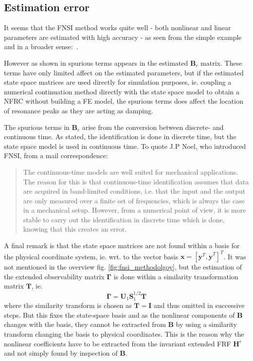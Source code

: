 \subsection{Estimation error}
\label{sec:fnsi-estimation-error}

It seems that the FNSI method works quite well - both nonlinear and linear
parameters are estimated with high accuracy - as seen from the simple example
and in a broader sense:~\autocites{noel2013a, noel2014a, noel2014b,
  noel2012time}.

However as shown in \autocite{gourc2016a} spurious terms appears in the
estimated $\bm B_c$ matrix. These terms have only limited affect on the
estimated parameters, but if the estimated state space matrices are used
directly for simulation purposes, ie. coupling a numerical continuation method
directly with the state space model to obtain a NFRC without building a FE
model, the spurious terms does affect the location of resonance peaks as they
are acting as damping.

The spurious terms in $\bm B_c$ arise from the conversion between discrete- and
continuous time. As stated, the identification is done in discrete time, but the state space
model is used in continuous time.
To quote J.P Noel, who introduced FNSI, from a mail correspondence:
\begin{quote}
The continuous-time models are well suited for mechanical applications. The reason
for this is that continuous-time identification assumes that data are acquired
in band-limited conditions, i.e. that the input and the output are only
measured over a finite set of frequencies, which is always the case in a
mechanical setup. However, from a numerical point of view, it is more stable to
carry out the identification in discrete time which is done, knowing that this
creates an error.
\end{quote}

A final remark is that the state space matrices are not found within a basis for
the physical coordinate system, ie. wrt. to the vector basis $\bm x=[\bm y^T,
\dot{\bm y}^T]^T$. It was not mentioned in the overview fig.
\ref{fig:fnsi_methodolgoy}, but the estimation of the extended observability
matrix $\bm \Gamma$ is done within a similarity transformation matrix $\bm
T$, ie.
\begin{equation}
  \bm \Gamma = \bm U_1 \bm S_1^{1/2} \bm T
\end{equation}
where the similarity transform is chosen as $\bm T = \bm I$ and thus omitted in
successive steps. But this fixes the state-space basis and as the nonlinear
components of $\bm B$ changes with the basis, they cannot be extracted from $\bm
B$ by using a similarity transform changing the basis to physical coordinates.
This is the reason why the nonlinear coefficients have to be extracted from the
invariant extended FRF $\bm H^e$ and not simply found by inspection of $\bm B$.

